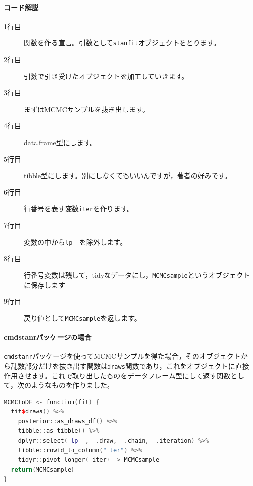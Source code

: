 \documentclass{ltjsbook}
\begin{document}
\paragraph{コード解説}
\begin{description}
	\item[1行目] 関数を作る宣言。引数として\verb|stanfit|オブジェクトをとります。
	\item[2行目] 引数で引き受けたオブジェクトを加工していきます。
	\item[3行目] まずはMCMCサンプルを抜き出します。
	\item[4行目] data.frame型にします。
	\item[5行目] tibble型にします。別にしなくてもいいんですが，著者の好みです。
	\item[6行目] 行番号を表す変数\verb|iter|を作ります。
	\item[7行目] 変数の中から\verb|lp__|を除外します。
	\item[8行目] 行番号変数は残して，tidyなデータにし，\verb|MCMCsample|というオブジェクトに保存します
	\item[9行目] 戻り値として\verb|MCMCsample|を返します。
\end{description}


\paragraph{cmdstanrパッケージの場合}
\verb|cmdstanr|パッケージを使ってMCMCサンプルを得た場合，そのオブジェクトから乱数部分だけを抜き出す関数は\verb|draws|関数であり，これをオブジェクトに直接作用させます。これで取り出したものをデータフレーム型にして返す関数として，次のようなものを作りました。

\begin{lstlisting}[language=C++,label={code:PRE_05MCMC2dfCMDstan},caption={MCMCtoDF関数(cmdstanr版)}]
MCMCtoDF <- function(fit) {
  fit$draws() %>%
    posterior::as_draws_df() %>%
    tibble::as_tibble() %>%
    dplyr::select(-lp__, -.draw, -.chain, -.iteration) %>%
    tibble::rowid_to_column("iter") %>%
    tidyr::pivot_longer(-iter) -> MCMCsample
  return(MCMCsample)
}
\end{lstlisting}
\end{document}
